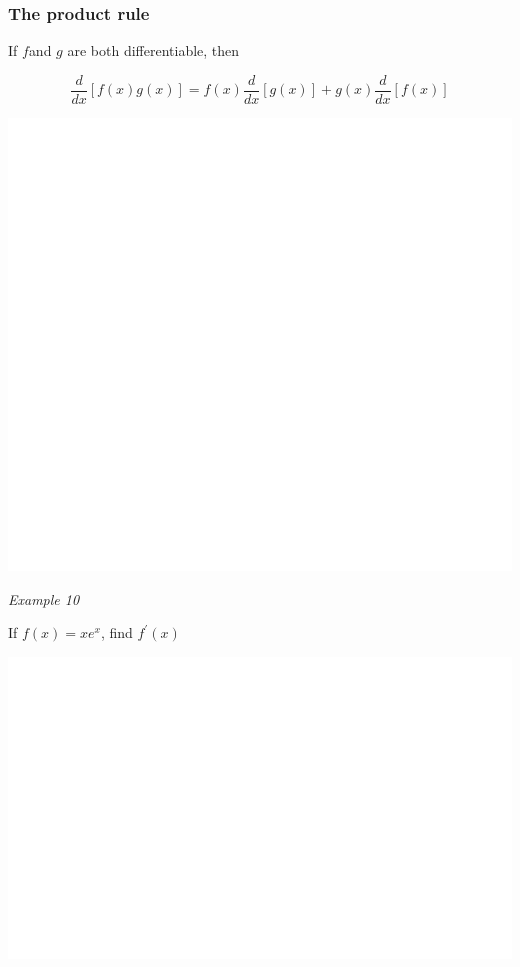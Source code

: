 \documentclass[]{book}
\begin{document}
\hypertarget{the-product-rule}{%
\subsubsection{The product rule}\label{the-product-rule}}

If \(f\)and \(g\) are both differentiable, then

\[\frac{d}{dx}[f(x)g(x)]= f(x)\frac{d}{dx}[g(x)]+ g(x)\frac{d}{dx}[f(x)]\]

\begin{center}\includegraphics[width=1\linewidth]{figure/LB17-1} \end{center}

\emph{Example 10}

If \(f(x)=xe^x\), find \(f^\prime(x)\)

\begin{center}\includegraphics[width=1\linewidth]{figure/LB18-1} \end{center}
\end{document}
